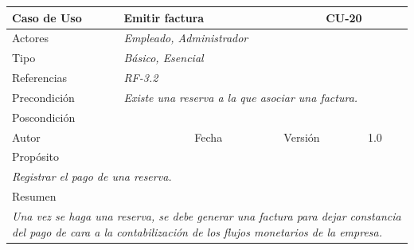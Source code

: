 \begin{table}[H]
    \begin{tabular}{|llllllll|}
    \hline
    \multicolumn{1}{|l|}{Caso de Uso}       & \multicolumn{5}{l|}{Emitir factura}                                                                          & \multicolumn{2}{l|}{\cellcolor[HTML]{E6E6E6}CU-20}          \\ \hline
    \multicolumn{1}{|l|}{Actores}           & \multicolumn{7}{l|}{{\color[HTML]{808080} \textit{Empleado, Administrador}}}                                                                                                                           \\ \hline
    \multicolumn{1}{|l|}{Tipo}              & \multicolumn{7}{l|}{{\color[HTML]{808080} \textit{Básico, Esencial}}}                                                                                                                \\ \hline
    \multicolumn{1}{|l|}{Referencias}       & \multicolumn{2}{l|}{{\color[HTML]{808080} \textit{RF-3.2}}}              & \multicolumn{5}{l|}{}                                                                                       \\ \hline
    \multicolumn{1}{|l|}{Precondición}      & \multicolumn{7}{l|}{{\color[HTML]{808080} \textit{Existe una reserva a la que asociar una factura.}}}                                                                                                \\ \hline
    \multicolumn{1}{|l|}{Poscondición}      & \multicolumn{7}{l|}{}                                                                                                                                                                  \\ \hline
    \multicolumn{1}{|l|}{Autor}             & \multicolumn{1}{l|}{}                        & \multicolumn{2}{l|}{Fecha}           & \multicolumn{1}{l|}{}     & \multicolumn{2}{l|}{Versión}         & 1.0                           \\ \hline
    \multicolumn{8}{|l|}{\cellcolor[HTML]{F2F2F2}Propósito}                                                                                                                                                                          \\ \hline
    \multicolumn{8}{|p{15cm}|}{{\color[HTML]{808080} \textit{Registrar el pago de una reserva.}}}                                                                                                           \\ \hline
    \multicolumn{8}{|l|}{\cellcolor[HTML]{F2F2F2}Resumen}                                                                                                                                                                            \\ \hline
    \multicolumn{8}{|p{15cm}|}{{\color[HTML]{808080} \textit{Una vez se haga una reserva, se debe generar una factura para dejar constancia del pago de cara a la contabilización de los flujos monetarios de la empresa.}}} \\ \hline
    \end{tabular}
\end{table}



